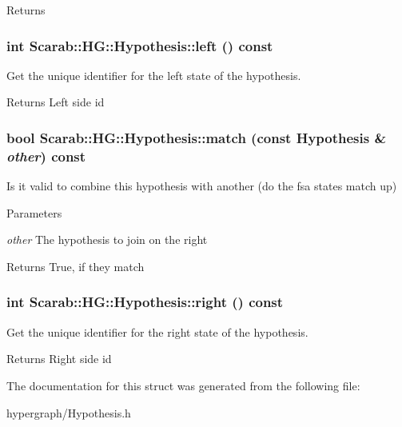 \begin{DoxyReturn}{Returns}

\end{DoxyReturn}
\hypertarget{structScarab_1_1HG_1_1Hypothesis_ac428cffa80bad102222f58463bfba7e5}{
\subsubsection[{left}]{\setlength{\rightskip}{0pt plus 5cm}int Scarab::HG::Hypothesis::left () const}}
\label{structScarab_1_1HG_1_1Hypothesis_ac428cffa80bad102222f58463bfba7e5}
Get the unique identifier for the left state of the hypothesis.

\begin{DoxyReturn}{Returns}
Left side id 
\end{DoxyReturn}
\hypertarget{structScarab_1_1HG_1_1Hypothesis_a698008183fc3863a0c03ba0c3e5960d1}{
\subsubsection[{match}]{\setlength{\rightskip}{0pt plus 5cm}bool Scarab::HG::Hypothesis::match (const {\bf Hypothesis} \& {\em other}) const}}
\label{structScarab_1_1HG_1_1Hypothesis_a698008183fc3863a0c03ba0c3e5960d1}
Is it valid to combine this hypothesis with another (do the fsa states match up) 
\begin{DoxyParams}{Parameters}
\item[{\em other}]The hypothesis to join on the right\end{DoxyParams}
\begin{DoxyReturn}{Returns}
True, if they match 
\end{DoxyReturn}
\hypertarget{structScarab_1_1HG_1_1Hypothesis_a6c026d211fd4f4875216fc179a78e879}{
\subsubsection[{right}]{\setlength{\rightskip}{0pt plus 5cm}int Scarab::HG::Hypothesis::right () const}}
\label{structScarab_1_1HG_1_1Hypothesis_a6c026d211fd4f4875216fc179a78e879}
Get the unique identifier for the right state of the hypothesis.

\begin{DoxyReturn}{Returns}
Right side id 
\end{DoxyReturn}


The documentation for this struct was generated from the following file:\begin{DoxyCompactItemize}
\item 
hypergraph/Hypothesis.h\end{DoxyCompactItemize}
